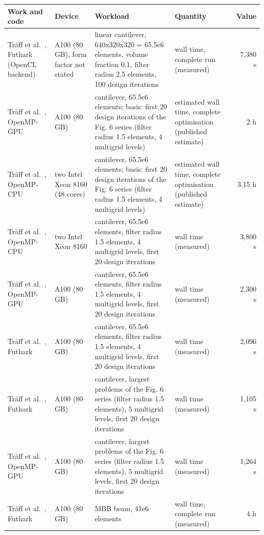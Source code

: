 \begin{tabular}{p{4.2cm}p{3.6cm}p{6.4cm}p{3.2cm}r}
\toprule
Work and code & Device & Workload & Quantity & Value \\
\midrule
Tr\"aff et al.~\cite{traff2023simple}, Futhark (OpenCL backend) & A100 (80 GB), form factor not stated & linear cantilever, 640x320x320 = 65.5e6 elements, volume fraction 0.1, filter radius 2.5 elements, 100 design iterations & wall time, complete run (measured) & 7{,}380 s \\
Tr\"aff et al.~\cite{traff2023simple}, OpenMP-GPU & A100 (80 GB) & cantilever, 65.5e6 elements; basis: first 20 design iterations of the Fig. 6 series (filter radius 1.5 elements, 4 multigrid levels) & estimated wall time, complete optimisation (published estimate) & 2 h \\
Tr\"aff et al.~\cite{traff2023simple}, OpenMP-CPU & two Intel Xeon 8160 (48 cores) & cantilever, 65.5e6 elements; basis: first 20 design iterations of the Fig. 6 series (filter radius 1.5 elements, 4 multigrid levels) & estimated wall time, complete optimisation (published estimate) & 3.15 h \\
Tr\"aff et al.~\cite{traff2023simple}, OpenMP-CPU & two Intel Xeon 8160 & cantilever, 65.5e6 elements, filter radius 1.5 elements, 4 multigrid levels, first 20 design iterations & wall time (measured) & 3{,}800 s \\
Tr\"aff et al.~\cite{traff2023simple}, OpenMP-GPU & A100 (80 GB) & cantilever, 65.5e6 elements, filter radius 1.5 elements, 4 multigrid levels, first 20 design iterations & wall time (measured) & 2{,}300 s \\
Tr\"aff et al.~\cite{traff2023simple}, Futhark & A100 (80 GB) & cantilever, 65.5e6 elements, filter radius 1.5 elements, 4 multigrid levels, first 20 design iterations & wall time (measured) & 2{,}096 s \\
Tr\"aff et al.~\cite{traff2023simple}, Futhark & A100 (80 GB) & cantilever, largest problems of the Fig. 6 series (filter radius 1.5 elements), 5 multigrid levels, first 20 design iterations & wall time (measured) & 1{,}105 s \\
Tr\"aff et al.~\cite{traff2023simple}, OpenMP-GPU & A100 (80 GB) & cantilever, largest problems of the Fig. 6 series (filter radius 1.5 elements), 5 multigrid levels, first 20 design iterations & wall time (measured) & 1{,}264 s \\
Tr\"aff et al.~\cite{traff2023simple}, Futhark & A100 (80 GB) & MBB beam, 41e6 elements & wall time, complete run (measured) & 4 h \\

\end{tabular}
